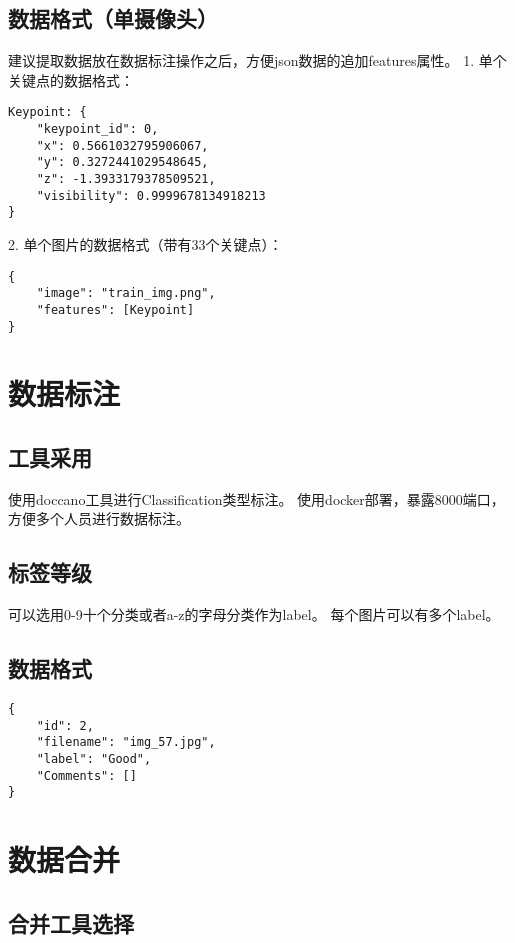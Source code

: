 \subsection{数据格式（单摄像头）}

建议提取数据放在数据标注操作之后，方便json数据的追加features属性。
1. 单个关键点的数据格式：
\begin{lstlisting}
Keypoint: {
    "keypoint_id": 0,
    "x": 0.5661032795906067,
    "y": 0.3272441029548645,
    "z": -1.3933179378509521,
    "visibility": 0.9999678134918213
}
\end{lstlisting}
2. 单个图片的数据格式（带有33个关键点）：
\begin{lstlisting}
{
    "image": "train_img.png",
    "features": [Keypoint]
}
\end{lstlisting}

\section{数据标注}

\subsection{工具采用}

使用doccano工具进行Classification类型标注。
使用docker部署，暴露8000端口，方便多个人员进行数据标注。

\subsection{标签等级}

可以选用0-9十个分类或者a-z的字母分类作为label。
每个图片可以有多个label。

\subsection{数据格式}

\begin{lstlisting}
{
    "id": 2,
    "filename": "img_57.jpg",
    "label": "Good",
    "Comments": []
}
\end{lstlisting}

\section{数据合并}

\subsection{合并工具选择}


